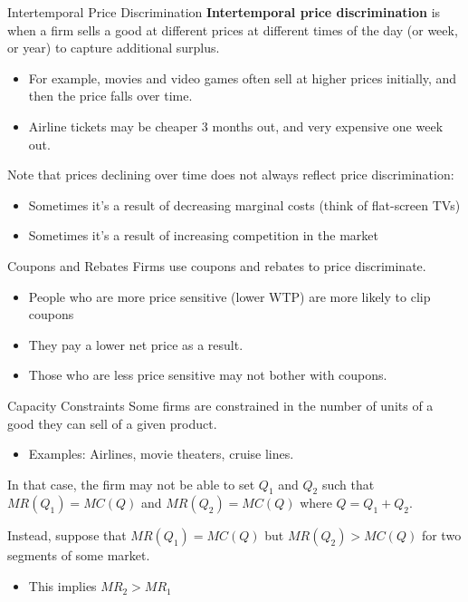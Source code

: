 \documentclass{beamer}
\begin{document}
\begin{frame}{Intertemporal Price Discrimination}
  \textbf{Intertemporal price discrimination} is when a firm sells a good at different prices at different times of the day (or week, or year) to capture additional surplus.

  \begin{itemize}
    \item For example, movies and video games often sell at higher prices initially, and then the price falls over time.
    
    \item Airline tickets may be cheaper 3 months out, and very expensive one week out.    
  \end{itemize}
  
  \bigskip
  Note that prices declining over time does not always reflect price discrimination:
  \begin{itemize}
    \item Sometimes it's a result of decreasing marginal costs (think of flat-screen TVs)
    \item Sometimes it's a result of increasing competition in the market
  \end{itemize}
\end{frame}

\begin{frame}{Coupons and Rebates}
  Firms use coupons and rebates to price discriminate.

  \begin{itemize}
    \item People who are more price sensitive (lower WTP) are more likely to clip coupons
    \item They pay a lower net price as a result.
    \item Those who are less price sensitive may not bother with coupons.
  \end{itemize}
\end{frame}

\begin{frame}{Capacity Constraints}
  Some firms are constrained in the number of units of a good they can sell of a given product.

  \begin{itemize}
    \item Examples: Airlines, movie theaters, cruise lines.
  \end{itemize}

  \bigskip
  In that case, the firm may not be able to set $Q_1$ and $Q_2$ such that $MR(Q_1) = MC(Q)$ and $MR(Q_2) = MC(Q)$ where $Q = Q_1 + Q_2$.
  
  \bigskip
  Instead, suppose that $MR(Q_1) = MC(Q)$ but $MR(Q_2) > MC(Q)$ for two segments of some market.
  \begin{itemize}
    \item This implies $MR_2 > MR_1$
  \end{itemize}
\end{frame}
\end{document}
